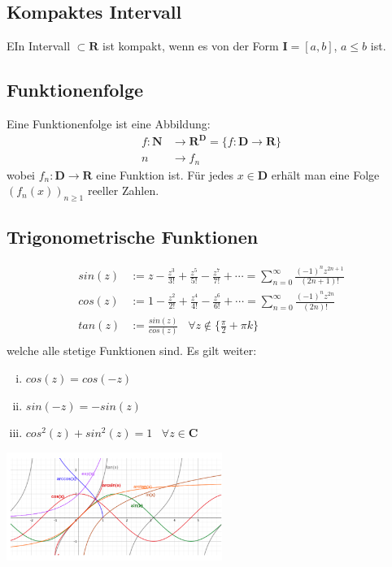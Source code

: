 \documentclass[8pt]{article}
\begin{document}
\begin{multicols*}{3}
\subsection{Kompaktes Intervall}

EIn Intervall $\subset \mathbf{R}$ ist kompakt, wenn es von der Form $\mathbf{I} = [a, b]$,
$a \leq b$ ist.

\subsection{Funktionenfolge}

Eine Funktionenfolge ist eine Abbildung:
\begin{align*}
  f:\mathbf{N} &\rightarrow \mathbf{R}^\mathbf{D} = \{f:\mathbf{D} \rightarrow \mathbf{R}\}\\
  n &\rightarrow f_n
\end{align*}
wobei $f_n: \mathbf{D} \rightarrow \mathbf{R}$ eine Funktion ist. Für jedes $x \in \mathbf{D}$
erhält man eine Folge $(f_n(x))_{n \geq 1}$ reeller Zahlen.

\subsection{Trigonometrische Funktionen}

\begin{align*}
  sin(z) &:= z - \frac{z^3}{3!} + \frac{z^5}{5!} - \frac{z^7}{7!} + \cdots = \sum_{n = 0}^\infty \frac{(-1)^n z^{2n + 1}}{(2n+1)!}\\
  cos(z) &:= 1 - \frac{z^2}{2!} + \frac{z^4}{4!} - \frac{z^6}{6!} + \cdots = \sum_{n = 0}^\infty \frac{(-1)^n z^{2n}}{(2n)!}\\
  tan(z) &:= \frac{sin(z)}{cos(z)}\;\;\; \forall z \not \in \{\frac{\pi}{2} + \pi k\}\\
\end{align*}
welche alle stetige Funktionen sind. Es gilt weiter:
\begin{enumerate}[(i)]
  \item $cos(z) = cos(-z)$
  \item $sin(-z) = -sin(z)$
  \item $cos^2(z) + sin^2(z) = 1 \;\;\; \forall z \in \mathbf{C}$
\end{enumerate}
\includegraphics[width=7cm]{functions.png}


\end{multicols*}
\end{document}

